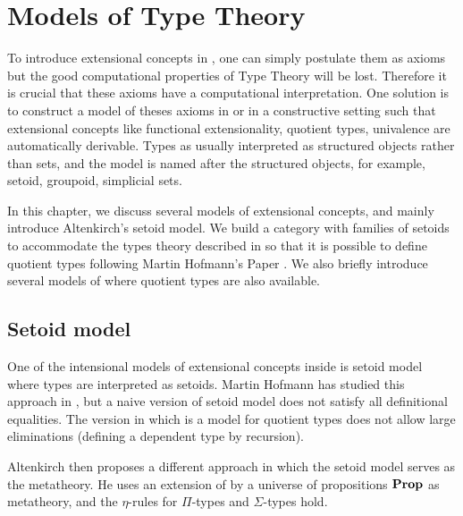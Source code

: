 

\chapter{Models of Type Theory}\label{models}


To introduce extensional concepts in \itt, one can simply postulate them as axioms but the good computational properties of Type Theory will be lost. Therefore it is crucial that these axioms have 
a computational interpretation. One solution is to construct a model of theses axioms in \itt or in a constructive setting such that extensional concepts like functional extensionality, quotient types, univalence are automatically derivable. Types as usually interpreted as structured objects rather than sets, and the model is named after the structured objects, for example, setoid, groupoid, simplicial sets. 


In this chapter, we discuss several models of extensional concepts, and mainly introduce Altenkirch's setoid model. We build a category with families of setoids to accommodate the types theory described in
\cite{alti:lics99}  so that it is possible to define quotient types following Martin Hofmann's Paper \cite{hof:95:sm}. We also briefly introduce several models of \hott where quotient types are also available.

\section{Setoid model}


One of the intensional models of extensional concepts inside \itt is setoid model where types are interpreted as setoids. Martin Hofmann has studied this approach in \cite{hof:phd}, but a naive version of setoid model does not satisfy all definitional equalities. The version in \cite{DBLP:conf/tlca/Hofmann95} which is a model for quotient types does not allow large eliminations (defining a dependent type by recursion).

Altenkirch then proposes \cite{alti:lics99} a different approach in which the setoid model serves as the metatheory.
He uses an extension of \itt by a universe of propositions $\operatorname{\mathbf{Prop}}$ as metatheory, and the $\eta$-rules for $\Pi$-types and $\Sigma$-types hold. 

